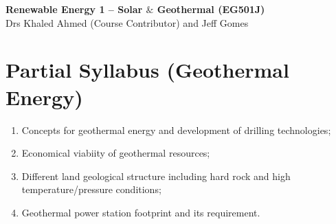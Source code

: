 \documentclass[11pt,oneside,a4paper]{article}
\begin{document}
\setcounter{page}{1}

\begin{center}
{\bf {\Large Renewable Energy 1 -- Solar $\&$ Geothermal (EG501J)}}\\
{\large Drs Khaled Ahmed (Course Contributor) and Jeff Gomes}
\end{center}

\section{Partial Syllabus (Geothermal Energy)}
%
\begin{enumerate}
%
\item Concepts for geothermal energy and development of drilling technologies;
\item Economical viabiity of geothermal resources;
\item Different land geological structure including hard rock and high temperature/pressure conditions;
\item Geothermal power station footprint and its requirement. 
%
\end{enumerate}


\end{document}

